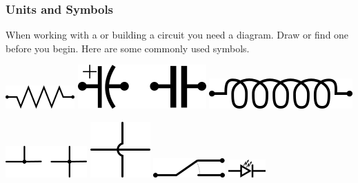 \documentclass[fleqn]{beamer} %
\newcommand{\sectionIsubsectionIIItitle}{Units and Symbols}
\begin{document}
			\begin{frame} 
				\frametitle{\sectionIsubsectionIIItitle}

				When working with a or building a circuit  you need a diagram. Draw or find one before you begin. Here are some commonly used symbols.\vspccc

				\includegraphics[scale=.4]{images/resistor_symbol.png} \hspace{15mm}
				\includegraphics[scale=.4]{images/capacitor_symbol.png} \hspace{15mm}
				\includegraphics[scale=.4]{images/inductor_symbol.png} \vspace{10mm}
				
				\includegraphics[scale=.5]{images/node_symbol.png} \hspace{15mm}
				\includegraphics[scale=.5]{images/jump_symbol.png} \hspace{15mm}
				\includegraphics[scale=.5]{images/switch_symbol.png} \hspace{15mm}
				\includegraphics[scale=.7]{images/led_symbol.png} \hspace{15mm}
				
			\end{frame}	

\end{document}
